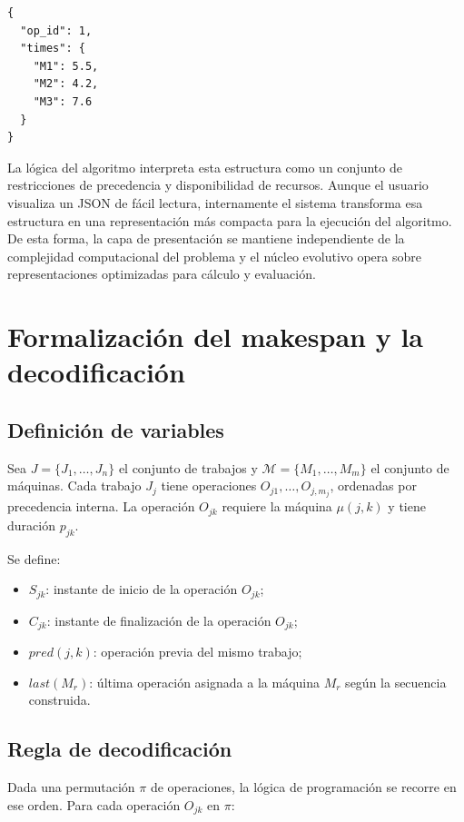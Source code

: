 \documentclass[11pt,a4paper]{article}
\begin{document}
\begin{verbatim}
{
  "op_id": 1,
  "times": {
    "M1": 5.5,
    "M2": 4.2,
    "M3": 7.6
  }
}
\end{verbatim}

La lógica del algoritmo interpreta esta estructura como un conjunto de restricciones de precedencia y disponibilidad de recursos. Aunque el usuario visualiza un JSON de fácil lectura, internamente el sistema transforma esa estructura en una representación más compacta para la ejecución del algoritmo. De esta forma, la capa de presentación se mantiene independiente de la complejidad computacional del problema y el núcleo evolutivo opera sobre representaciones optimizadas para cálculo y evaluación.

\section{Formalización del makespan y la decodificación}

\subsection{Definición de variables}

Sea $J = \{J_1, \dots, J_n\}$ el conjunto de trabajos y $\mathcal{M} = \{M_1, \dots, M_m\}$ el conjunto de máquinas. Cada trabajo $J_j$ tiene operaciones $O_{j1}, \dots, O_{j,m_j}$, ordenadas por precedencia interna. La operación $O_{jk}$ requiere la máquina $\mu(j,k)$ y tiene duración $p_{jk}$.

Se define:

\begin{itemize}
    \item $S_{jk}$: instante de inicio de la operación $O_{jk}$;
    \item $C_{jk}$: instante de finalización de la operación $O_{jk}$;
    \item $pred(j,k)$: operación previa del mismo trabajo;
    \item $last(M_r)$: última operación asignada a la máquina $M_r$ según la secuencia construida.
\end{itemize}

\subsection{Regla de decodificación}

Dada una permutación $\pi$ de operaciones, la lógica de programación se recorre en ese orden. Para cada operación $O_{jk}$ en $\pi$:
\end{document}

